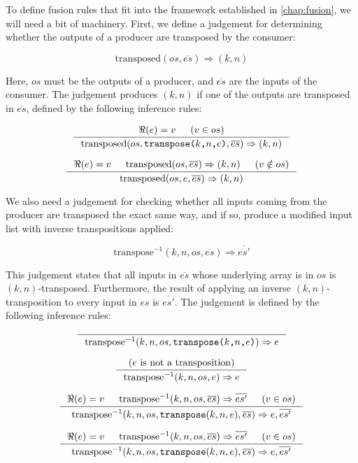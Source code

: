To define fusion rules that fit into the framework established in
\cref{chap:fusion}, we will need a bit of machinery.  First, we define
a judgement for determining whether the outputs of a producer are
transposed by the consumer:

\[
\boxed{
  \text{transposed}(os,\overline{es}) \Rightarrow (k,n)
}
\]

Here, $os$ must be the outputs of a producer, and $\overline{es}$ are
the inputs of the consumer.  The judgement produces $(k,n)$ if one of
the outputs are transposed in $\overline{es}$, defined by the
following inference rules:

\[
\inference{
  \Re(e) = v
  &
  (v \in os)
}{
  \text{transposed}(os, \texttt{transpose($k$,$n$,$e$)}, \overline{es}) \Rightarrow (k,n)
}
\]

\[
\inference{
  \Re(e) = v
  &
  \text{transposed}(os,\overline{es}) \Rightarrow (k,n)
  &
  (v \notin os)
}{
  \text{transposed}(os, e, \overline{es}) \Rightarrow (k,n)
}
\]

We also need a judgement for checking whether all inputs coming from
the producer are transposed the exact same way, and if so, produce a
modified input list with inverse transpositions applied:

\[
\boxed{
  \text{transpose}^{-1}(k, n, os, \overline{es}) \Rightarrow \overline{es'}
}
\]

This judgement states that all inputs in $\overline{es}$ whose
underlying array is in $os$ is $(k,n)$-transposed.  Furthermore, the
result of applying an inverse $(k,n)$-transposition to every input in
$es$ is $\overline{es'}$.  The judgement is defined by the following
inference rules:

\[
\inference{
}{
  \text{transpose}^{-1}(k, n, os,\texttt{transpose($k$,$n$,$e$)}) \Rightarrow e
}
\]

\[
\inference{
  (\text{$e$ is not a transposition})
}{
  \text{transpose}^{-1}(k, n, os, e) \Rightarrow e
}
\]

\[
\inference{
  \Re(e) = v
  &
  \text{transpose}^{-1}(k, n, os, \overline{es}) \Rightarrow \overline{es'}
  &
  (v \in os)
}{
  \text{transpose}^{-1}(k, n, os, \texttt{transpose}(k, n, e), \overline{es}) \Rightarrow e, \overline{es'}
}
\]

\[
\inference{
  \Re(e) = v
  &
  \text{transpose}^{-1}(k, n, os, \overline{es}) \Rightarrow \overline{es'}
  &
  (v \in os)
}{
  \text{transpose}^{-1}(k, n, os, \texttt{transpose}(k,n,e), \overline{es}) \Rightarrow e, \overline{es'}
}
\]

